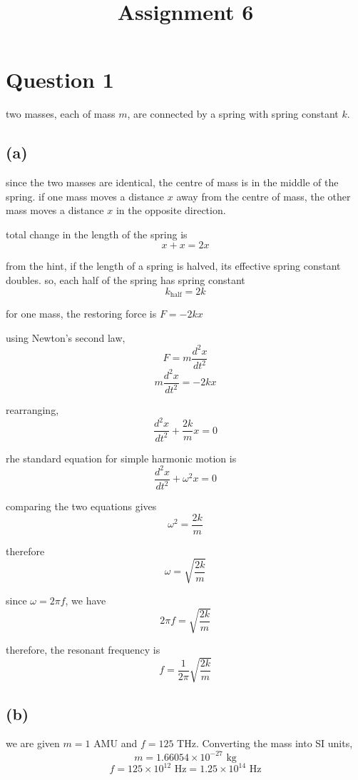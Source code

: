 \documentclass{article}
\title{Assignment 6}
\begin{document}
\setlength{\parindent}{0pt}
\maketitle

\section{Question 1}

two masses, each of mass $m$, are connected by a spring with spring constant $k$. 

\subsection*{(a)} 
since the two masses are identical, the centre of mass is in the middle of the spring. 
if one mass moves a distance $x$ away from the centre of mass, the other mass moves a 
distance $x$ in the opposite direction. 

total change in the length of the spring is 
\[
x+x=2x
\]

from the hint, if the length of a spring is halved, its effective spring constant doubles. 
so, each half of the spring has spring constant 
\[
k_{\text{half}}=2k
\]

for one mass, the restoring force is $F=-2kx$

using Newton's second law, 
\[
F=m\frac{d^2x}{dt^2}
\]
\[
m\frac{d^2x}{dt^2}=-2kx
\]

rearranging, 
\[
\frac{d^2x}{dt^2}+\frac{2k}{m}x=0
\]

rhe standard equation for simple harmonic motion is 
\[
\frac{d^2x}{dt^2}+\omega^2x=0
\]

comparing the two equations gives
\[ \omega^2=\frac{2k}{m}
\]

therefore
\[
\omega=\sqrt{\frac{2k}{m}}
\]

since $\omega=2\pi f$, we have 
\[
2\pi f=\sqrt{\frac{2k}{m}}
\]

therefore, the resonant frequency is
\[
\boxed{ f=\frac{1}{2\pi}\sqrt{\frac{2k}{m}} }
\] 

\subsection*{(b)}
we are given $m=1\text{ AMU}$ and $f=125\text{ THz}$. Converting the mass into SI units,
\[
m=1.66054\times10^{-27}\text{ kg}
\]
\[
f=125\times10^{12}\text{ Hz} =1.25\times10^{14}\text{ Hz}
\]
\end{document}
